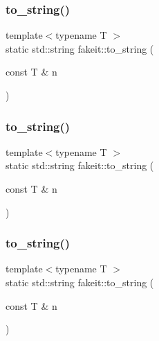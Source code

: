 \mbox{\label{namespacefakeit_a9004af88fd6282c85adc4aa7495b9cbe}} 
\subsubsection{\texorpdfstring{to\_string()}{to\_string()}\hspace{0.1cm}{\footnotesize\ttfamily [5/9]}}
{\footnotesize\ttfamily template$<$typename T $>$ \\
static std\+::string fakeit\+::to\+\_\+string (\begin{DoxyParamCaption}\item[{const T \&}]{n }\end{DoxyParamCaption})\hspace{0.3cm}{\ttfamily [static]}}

\mbox{\label{namespacefakeit_a9004af88fd6282c85adc4aa7495b9cbe}} 
\subsubsection{\texorpdfstring{to\_string()}{to\_string()}\hspace{0.1cm}{\footnotesize\ttfamily [6/9]}}
{\footnotesize\ttfamily template$<$typename T $>$ \\
static std\+::string fakeit\+::to\+\_\+string (\begin{DoxyParamCaption}\item[{const T \&}]{n }\end{DoxyParamCaption})\hspace{0.3cm}{\ttfamily [static]}}

\mbox{\label{namespacefakeit_a9004af88fd6282c85adc4aa7495b9cbe}} 
\subsubsection{\texorpdfstring{to\_string()}{to\_string()}\hspace{0.1cm}{\footnotesize\ttfamily [7/9]}}
{\footnotesize\ttfamily template$<$typename T $>$ \\
static std\+::string fakeit\+::to\+\_\+string (\begin{DoxyParamCaption}\item[{const T \&}]{n }\end{DoxyParamCaption})\hspace{0.3cm}{\ttfamily [static]}}


